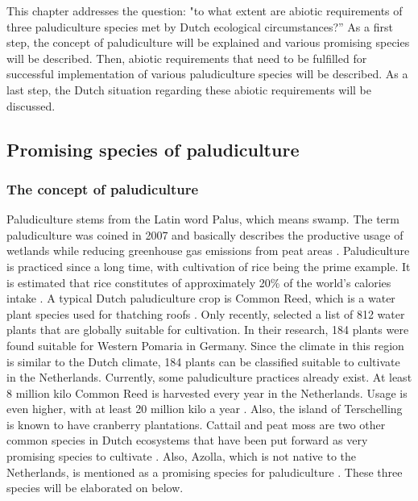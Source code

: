 \documentclass[12pt,a4paper,titlepage]{article}
\begin{document}
This chapter addresses the question: "to what extent are abiotic requirements of three paludiculture species met by Dutch ecological circumstances?” As a first step, the concept of paludiculture will be explained and various promising species will be described. Then, abiotic requirements that need to be fulfilled for successful implementation of various paludiculture species will be described. As a last step, the Dutch situation regarding these abiotic requirements will be discussed.


\subsection{Promising species of paludiculture}


\subsubsection{The concept of paludiculture}

Paludiculture stems from the Latin word Palus, which means swamp. The term paludiculture was coined in 2007 and basically describes the productive usage of wetlands while reducing greenhouse gas emissions from peat areas \citep{wichtmann2007paludiculture}. Paludiculture is practiced since a long time, with cultivation of rice being the prime example. It is estimated that rice constitutes of approximately 20\% of the world's calories intake \citep{wichtmann2007paludiculture}. A typical Dutch paludiculture crop is Common Reed, which is a water plant species used for thatching roofs \citep{wichtmann2016paludiculture}. Only recently, \citet{abel2013database} selected a list of 812 water plants that are globally suitable for cultivation. In their research, 184 plants were found suitable for Western Pomaria in Germany. Since the climate in this region is similar to the Dutch climate, 184 plants can be classified suitable to cultivate in the Netherlands. Currently, some paludiculture practices already exist. At least 8 million kilo Common Reed is harvested every year in the Netherlands. Usage is even higher, with at least 20 million kilo a year \citep{wichtmann2016paludiculture}. Also, the island of Terschelling is known to have cranberry plantations. Cattail and peat moss are two other common species in Dutch ecosystems that have been put forward as very promising species to cultivate \citep{abel2013database, van2013werk}. Also, Azolla, which is not native to the Netherlands, is mentioned as a promising species for paludiculture \citep{abel2013database, van2013werk}. These three species will be elaborated on below.
\end{document}
